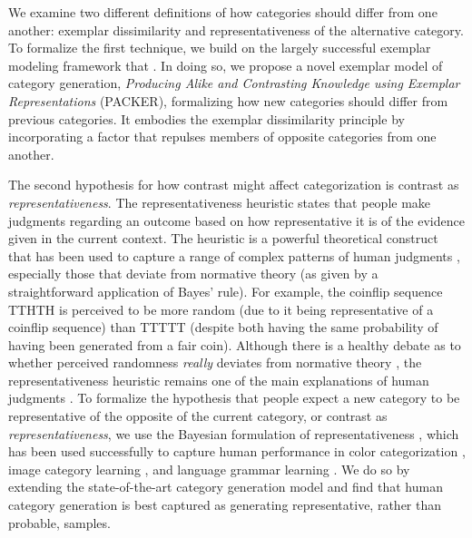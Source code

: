 \documentclass[12pt]{article}
\begin{document}
\begin{flushleft}
We examine two different definitions of how categories should differ from one
another: exemplar dissimilarity and representativeness of the alternative
category. To formalize the first technique, we build on the largely successful
exemplar modeling framework that
\citep{medin1978context,nosofsky1984choice,nosofsky1986attention}. In doing so,
we propose a novel exemplar model of category generation, {\em Producing Alike
  and Contrasting Knowledge using Exemplar Representations} (PACKER),
formalizing how new categories should differ from previous categories. It
embodies the exemplar dissimilarity principle by incorporating a factor that
repulses members of opposite categories from one another. 

The second hypothesis for how contrast might affect categorization is contrast
as {\em representativeness}. The representativeness heuristic \citep{kahneman1972subjective}
states that people make judgments regarding an outcome based on how
representative it is of the evidence given in the current context. The heuristic
is a powerful theoretical construct that has been used to capture a range of
complex patterns of human judgments \citep{kahneman73,tversky74,tversky83},
especially those that deviate from normative theory (as given by a
straightforward application of Bayes' rule). For example, the coinflip sequence
TTHTH is perceived to be more random (due to it being representative of a
coinflip sequence) than TTTTT (despite both having the same probability of
having been generated from a fair coin). Although there is a healthy debate as
to whether perceived randomness {\em really} deviates from normative theory
\citep{griffiths18,hahn09}, the representativeness heuristic remains one of the
main explanations of human judgments \citep{reimers18}. To formalize the
hypothesis that people expect a new category to be representative of the
opposite of the current category, or contrast as {\em representativeness}, we
use the Bayesian formulation of representativeness \citep{tenenbaum01}, which
has been used successfully to capture human performance in color categorization
\citep{abbott16}, image category learning \citep{abbott11}, and language grammar
learning \citep{rafferty10}. We do so by extending the state-of-the-art category
generation model \citep{jern2013probabilistic} and find that human category
generation is best captured as generating representative, rather than probable,
samples.


\end{flushleft}
\end{document}
